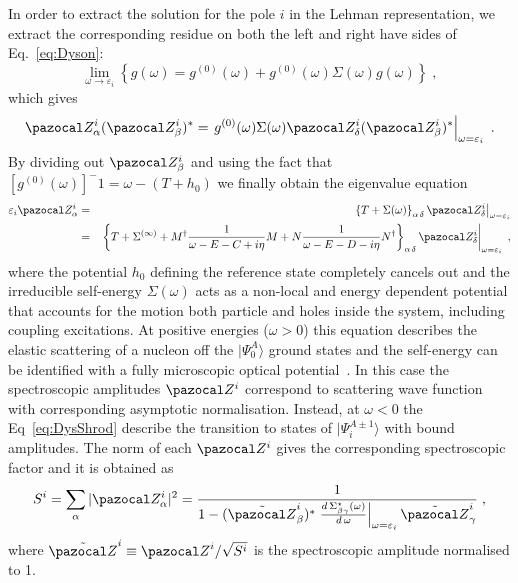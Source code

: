 In order to extract the solution for the pole $i$ in the Lehman representation, we extract the corresponding residue on both the left and right have sides of Eq.~\eqref{eq:Dyson}:
 \begin{equation}
   \lim _{\omega \rightarrow \varepsilon_i} 
   \left\{
     g(\omega) = g^{(0)}(\omega) + g^{(0)}(\omega)  \Sigma(\omega) g(\omega)
   \right\} \; ,
 \end{equation}
which gives 
 \begin{equation}
    \pazocal Z^i_\alpha (\pazocal Z^i_\beta)^*  =  \left. g^{(0)}(\omega)  \Sigma(\omega) \pazocal Z^i_\delta (\pazocal Z^i_\beta)^* 
    \right|_{\omega = \varepsilon_i}
 \; .
 \end{equation}
By dividing out $\pazocal Z^i_\beta$ and using the fact that $[g^{(0)}(\omega)]^-1 = \omega - (T + h_0)$ we finally obtain the 
eigenvalue equation
 \begin{eqnarray}
   \varepsilon_i   \pazocal Z^i_\alpha &=&   \left. \left\{ T +   \Sigma(\omega)   \right\}_{\alpha \, \delta}
  \pazocal Z^i_\delta  \right|_{\omega = \varepsilon_i}
  \nonumber \\
  &=&  \left. \left\{  T +  \Sigma^{(\infty)} +M^\dagger\frac1{\omega - E -C + i \eta}M +N\frac1{\omega - E -D - i \eta}N^\dagger     \right\}_{\alpha \, \delta}
  \pazocal Z^i_\delta  \right|_{\omega = \varepsilon_i}  \; ,
\label{eq:DysSchrod}
 \end{eqnarray}
where the potential $h_0$ defining the reference state completely cancels out and the irreducible self-energy $\Sigma(\omega)$
acts as a non-local and energy dependent potential that accounts for the motion both particle and holes inside the system, including 
coupling excitations.
At positive energies ($\omega > 0$) this equation describes the elastic scattering of a nucleon off the $|\Psi^A_0\rangle$ ground
states and the self-energy can be identified with a fully microscopic optical potential~\cite{Cederbaum2001,Capuzzi1996,Barbieri2005}.
In this case the spectroscopic amplitudes $\pazocal Z^i$ correspond to scattering wave function with corresponding asymptotic 
normalisation.
Instead, at $\omega < 0$ the Eq~\ref{eq:DysShrod}  describe the transition to states of $|\Psi^{A\pm1}_i\rangle$ with bound amplitudes. 
The norm of each $\pazocal Z^i$ gives the corresponding spectroscopic factor and it is obtained as
\begin{equation}
 S^i = \sum_\alpha |\pazocal Z^i_\alpha|^2 =  \frac 1 {1 - (\tilde{\pazocal Z}^i_\beta)^* 
   \left. \frac{d \, \Sigma^\star_{\beta \gamma}(\omega)}{d \, \omega} \right|_{\omega = \varepsilon_i}
    \tilde{\pazocal Z}^i_\gamma}   \; ,
\label{eq:SFnorm1}
\end{equation}
where $\tilde{\pazocal Z}^i \equiv {\pazocal Z}^i / \sqrt{S^i}$ is the spectroscopic amplitude normalised to 1.


